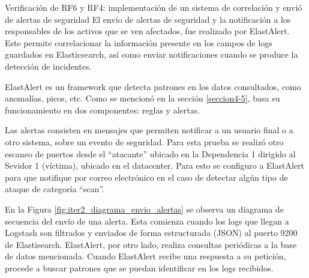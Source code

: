     \begin{section}{Verificación de RF6 y RF4: implementación de un sistema de correlación y envió de alertas de seguridad}
    El envío de alertas de seguridad y la notificación a los responsables de los activos que se ven afectados, fue realizado por ElastAlert. Este permite correlacionar la información presente en los campos de logs guardados en Elasticsearch, así como enviar notificaciones cuando se produce la detección de incidentes. \par
    
    ElastAlert es un framework que detecta patrones en los datos consultados, como anomalías, picos, etc. Como se mencionó en la sección \ref{seccion4-5}, basa su funcionamiento en dos componentes: reglas y alertas. \par
   
    Las alertas consisten en mensajes que permiten notificar a un usuario final o a otro sistema, sobre un evento de seguridad. Para esta prueba se realizó otro escaneo de puertos desde el “atacante” ubicado en la Dependencia 1 dirigido al Sevidor 1 (víctima), ubicado en el datacenter. Para esto se configuro a ElastAlert para que notifique por correo electrónico en el caso de detectar algún tipo de ataque de categoría “scan”.\par
    
    En la Figura \ref{fig:iter2_diagrama_envio_alertas} se observa un diagrama de secuencia del envío de una alerta. Esta comienza cuando los logs que llegan a Logstash son filtrados y enviados de forma estructurada (JSON) al puerto 9200 de Elastisearch. ElastAlert, por otro lado, realiza consultas periódicas a la base de datos mencionada. Cuando ElastAlert recibe una respuesta a su petición, procede a buscar patrones que se puedan identificar en los logs recibidos. \par
    

\end{section}
